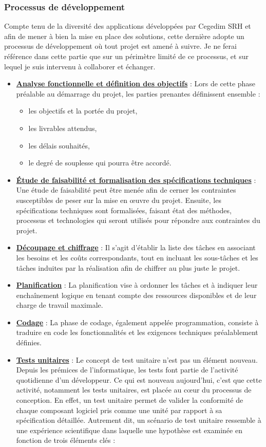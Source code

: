 \subsubsection{Processus de développement}
Compte tenu de la diversité des applications développées par Cegedim SRH et afin de mener à bien la mise en place des solutions, cette dernière adopte un processus de développement où tout projet est amené à suivre. Je ne ferai référence dans cette partie que sur un périmètre limité de ce processus, et sur lequel je suis intervenu à collaborer et échanger.
\begin{itemize}
    \item \textbf{\underline{Analyse fonctionnelle et définition des objectifs}} : Lors de cette phase préalable au démarrage du projet, les parties prenantes définissent ensemble :
    \begin{itemize}
        \item les objectifs et la portée du projet,
        \item les livrables attendus,
        \item les délais souhaités,
        \item le degré de souplesse qui pourra être accordé.
    \end{itemize}
    \item \textbf{\underline{Étude de faisabilité et formalisation des spécifications techniques}} : Une étude de faisabilité peut être menée afin de cerner les contraintes susceptibles de peser sur la mise en œuvre du projet. Ensuite, les spécifications techniques sont formalisées, faisant état des méthodes, processus et technologies qui seront utilisés pour répondre aux contraintes du projet.
    \item \textbf{\underline{Découpage et chiffrage}} : Il s'agit d'établir la liste des tâches en associant les besoins et les coûts correspondants, tout en incluant les sous-tâches et les tâches induites par la réalisation afin de chiffrer au plus juste le projet.
    \item \textbf{\underline{Planification}} : La planification vise à ordonner les tâches et à indiquer leur enchaînement logique en tenant compte des ressources disponibles et de leur charge de travail maximale.
    \item \textbf{\underline{Codage}} : La phase de codage, également appelée programmation, consiste à traduire en code les fonctionnalités et les exigences techniques préalablement définies.
    \item \textbf{\underline{Tests unitaires}} : Le concept de test unitaire n'est pas un élément nouveau. Depuis les prémices de l'informatique, les tests font partie de l'activité quotidienne d'un développeur. Ce qui est nouveau aujourd'hui, c'est que cette activité, notamment les tests unitaires, est placée au cœur du processus de conception. En effet, un test unitaire permet de valider la conformité de chaque composant logiciel pris comme une unité par rapport à sa spécification détaillée. Autrement dit, un scénario de test unitaire ressemble à une expérience scientifique dans laquelle une hypothèse est examinée en fonction de trois éléments clés :

\end{itemize}
